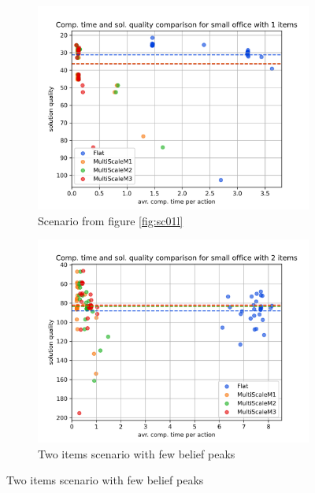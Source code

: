 \begin{figure}
    \centering
    \begin{subfigure}[b]{0.49\textwidth}
        \includegraphics[width=\textwidth]{Report/images/comp_time_vs_sol_quality/envsmall_sc01_scatter_comptimes_vs_solqual.png}
        \caption{Scenario from figure \ref{fig:sc01l}}
        \label{subfig:comp_sc01}
    \end{subfigure}
    \begin{subfigure}[b]{0.49\textwidth}
         \includegraphics[width=\textwidth]{Report/images/comp_time_vs_sol_quality/envsmall_sc04_scatter_comptimes_vs_solqual.png}
        \caption{Two items scenario with few belief peaks}
        \label{subfig:comp_sc04}
    \end{subfigure}

\end{figure}
